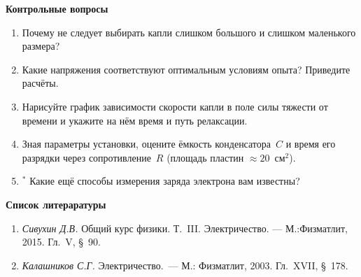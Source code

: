 
{\small

{\bf \Large Контрольные вопросы}
\begin{enumerate}

\item{ Почему не следует выбирать капли слишком большого и слишком маленького размера?}

\item{ Какие напряжения соответствуют оптимальным условиям опыта? Приведите расчёты.}

\item{ Нарисуйте график зависимости скорости капли в поле силы тяжести от времени и укажите на нём время и путь релаксации.}

\item{ Зная параметры установки, оцените ёмкость конденсатора~$C$ и время его разрядки через сопротивление~$R$ (площадь пластин ${\approx}20$~см$^2$).}

\item{$^*$ Какие ещё способы измерения заряда электрона вам известны?}
\end{enumerate}

{\bf \Large Список литераратуры}

\begin{enumerate}

\item{ {\em Сивухин Д.В.} Общий курс физики. Т.~III. Электричество. --- М.:Физматлит, 2015. Гл.~V, \S~90.}

\item{ {\em Калашников С.Г.} Электричество.~--- М.: Физматлит, 2003. Гл.~XVII, \S~178.}
\end{enumerate}
}